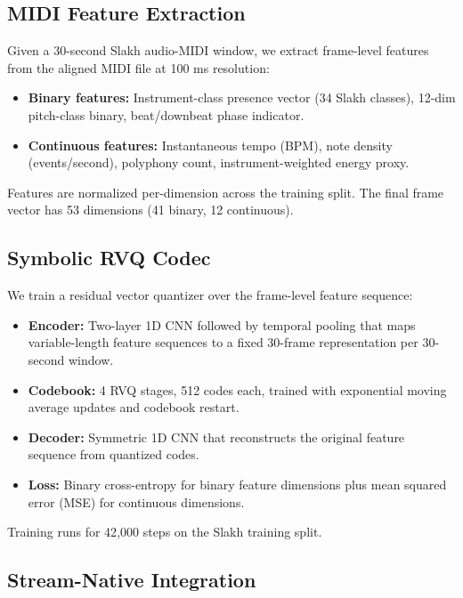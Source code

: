 \documentclass[11pt]{article}
\begin{document}
\subsection{MIDI Feature Extraction}

Given a 30-second Slakh audio-MIDI window, we extract frame-level features from the
aligned MIDI file at 100 ms resolution:

\begin{itemize}
  \item \textbf{Binary features:} Instrument-class presence vector (34 Slakh classes),
    12-dim pitch-class binary, beat/downbeat phase indicator.
  \item \textbf{Continuous features:} Instantaneous tempo (BPM), note density
    (events/second), polyphony count, instrument-weighted energy proxy.
\end{itemize}

Features are normalized per-dimension across the training split.  The final frame
vector has 53 dimensions (41 binary, 12 continuous).

\subsection{Symbolic RVQ Codec}

We train a residual vector quantizer over the frame-level feature sequence:
\begin{itemize}
  \item \textbf{Encoder:} Two-layer 1D CNN followed by temporal pooling that maps
    variable-length feature sequences to a fixed 30-frame representation per
    30-second window.
  \item \textbf{Codebook:} 4 RVQ stages, 512 codes each, trained with exponential
    moving average updates and codebook restart.
  \item \textbf{Decoder:} Symmetric 1D CNN that reconstructs the original feature
    sequence from quantized codes.
  \item \textbf{Loss:} Binary cross-entropy for binary feature dimensions plus mean
    squared error (MSE) for continuous dimensions.
\end{itemize}

Training runs for 42{,}000 steps on the Slakh training split.

\subsection{Stream-Native Integration}
\end{document}
